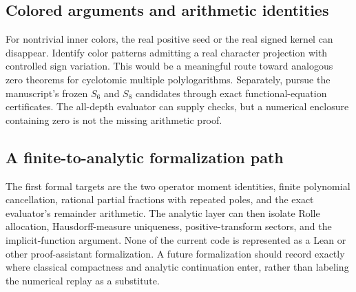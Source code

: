 \subsection{Colored arguments and arithmetic identities}
For nontrivial inner colors, the real positive seed or the real signed
kernel can disappear. Identify color patterns admitting a real
character projection with controlled sign variation. This would be a
meaningful route toward analogous zero theorems for cyclotomic multiple
polylogarithms. Separately, pursue the manuscript's frozen $S_6$ and
$S_8$ candidates through exact functional-equation certificates. The
all-depth evaluator can supply checks, but a numerical enclosure
containing zero is not the missing arithmetic proof.

\subsection{A finite-to-analytic formalization path}
The first formal targets are the two operator moment identities,
finite polynomial cancellation, rational partial fractions with repeated
poles, and the exact evaluator's remainder arithmetic. The analytic
layer can then isolate Rolle allocation, Hausdorff-measure uniqueness,
positive-transform sectors, and the implicit-function argument.
None of the current code is represented as a Lean or other
proof-assistant formalization. A future formalization should record
exactly where classical compactness and analytic continuation enter,
rather than labeling the numerical replay as a substitute.
